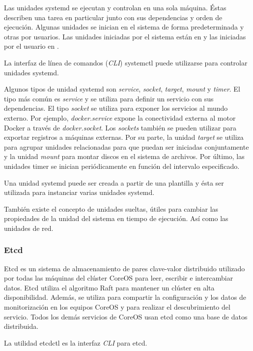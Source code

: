 Las unidades systemd se ejecutan y controlan en una sola máquina. Éstas describen una tarea en particular junto con sus dependencias y orden de ejecución. Algunas unidades se inician en el sistema de forma predeterminada y otras por usuarios. Las unidades iniciadas por el sistema están en  y las iniciadas por el usuario en .

La interfaz de línea de comandos (\textit{CLI}) systemctl puede utilizarse para controlar unidades systemd.

Algunos tipos de unidad systemd son \textit{service}, \textit{socket}, \textit{target}, \textit{mount} y \textit{timer}. El tipo más común es \textit{service} y se utiliza para definir un servicio con sus dependencias. El tipo \textit{socket} se utiliza para exponer los servicios al mundo externo. Por ejemplo, \textit{docker.service} expone la conectividad externa al motor Docker a través de \textit{docker.socket}. Los \textit{sockets} también se pueden utilizar para exportar registros a máquinas externas. Por su parte, la unidad \textit{target} se utiliza para agrupar unidades relacionadas para que puedan ser iniciadas conjuntamente y la unidad \textit{mount} para montar discos en el sistema de archivos. Por último, las unidades timer se inician periódicamente en función del intervalo especificado.

Una unidad systemd puede ser creada a partir de una plantilla y ésta ser utilizada para instanciar varias unidades systemd.

También existe el concepto de unidades sueltas, útiles para cambiar las propiedades de la unidad del sistema en tiempo de ejecución. Así como las unidades de red.

\subsubsection{Etcd}

Etcd es un sistema de almacenamiento de pares clave-valor distribuido utilizado por todas las máquinas del clúster CoreOS para leer, escribir e intercambiar datos. Etcd utiliza el algoritmo Raft para mantener un clúster en alta disponibilidad. Además, se utiliza para compartir la configuración y los datos de monitorización en los equipos CoreOS y para realizar el descubrimiento del servicio. Todos los demás servicios de CoreOS usan etcd como una base de datos distribuida. 

La utilidad etcdctl es la interfaz \textit{CLI} para etcd.

